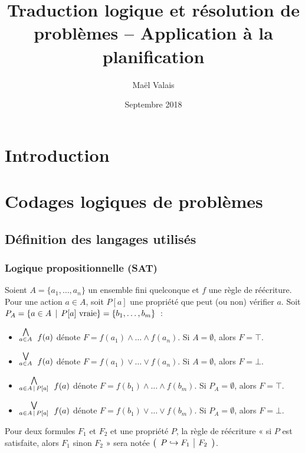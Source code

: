 \documentclass[a4paper,12pt,oneside]{extbook}
\title{Traduction logique et résolution de problèmes -- Application à la planification}
\author{Maël Valais}
\date{Septembre 2018}
\begin{document}
\tableofcontents

\chapter{Introduction}\label{chap:intro}




\chapter{Codages logiques de problèmes}\label{chap:codages}

\section{Définition des langages utilisés}
\subsection{Logique propositionnelle (SAT)}

{\color{red}

Soient $A=\{a_1, \ldots, a_n\}$ un ensemble fini quelconque et $f$ une règle de
réécriture.  Pour une action $a\in A$, soit $P[a]$ une propriété que peut (ou
non) vérifier $a$. Soit $P_A=\{a\in A \,\mid\, P[a]\
\mathrm{vraie}\}=\{b_1,\ldots,b_m\}$~:
\begin{itemize}
\item $\stackrel{\bigwedge}{_{a\in A}}~ f(a)$ dénote $F=f(a_1) \land\ldots\land f(a_n)$. Si $A=\emptyset$, alors $F=\top$.
\item $\stackrel{\bigvee}{_{a\in A}}~ f(a)$ dénote $F=f(a_1) \lor\ldots\lor f(a_n)$. Si $A=\emptyset$, alors $F=\bot$.
\item $\stackrel{\bigwedge}{_{a\in A \,\mid\, P[a]}}~ f(a)$ dénote $F=f(b_1) \land\ldots\land f(b_m)$. Si $P_A=\emptyset$, alors $F=\top$.
\item $\stackrel{\bigvee}{_{a\in A \,\mid\, P[a]}}~ f(a)$ dénote $F=f(b_1) \lor\ldots\lor f(b_m)$. Si $P_A=\emptyset$, alors $F=\bot$.
\end{itemize}

Pour deux formules $F_1$ et $F_2$ et une propriété $P$, la règle de réécriture
« si $P$ est satisfaite, alors $F_1$ sinon $F_2$ » sera notée
$\left(\begin{array}{l|l}{P}\hookrightarrow{F_1} & {F_2}\end{array}\right)$.
}
\end{document}
